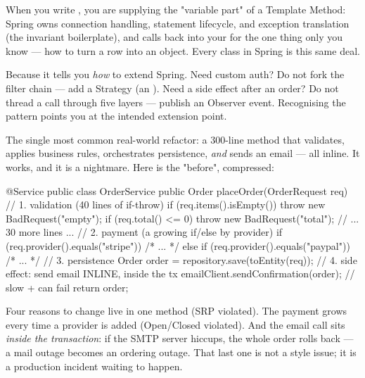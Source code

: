 \begin{behind}
When you write , you are supplying the "variable part" of a Template Method: Spring owns connection handling, statement lifecycle, and exception translation (the invariant boilerplate), and calls back into your  for the one thing only you know --- how to turn a row into an object. Every  class in Spring is this same deal.
\end{behind}

 Because it tells you \emph{how} to extend Spring. Need custom auth? Do not fork the filter chain --- add a Strategy (an ). Need a side effect after an order? Do not thread a call through five layers --- publish an Observer event. Recognising the pattern points you at the intended extension point.


 The single most common real-world refactor: a 300-line method that validates, applies business rules, orchestrates persistence, \emph{and} sends an email --- all inline. It works, and it is a nightmare. Here is the "before", compressed:

\begin{javabox}
@Service
public class OrderService {
  public Order placeOrder(OrderRequest req) {
    // 1. validation (40 lines of if-throw)
    if (req.items().isEmpty()) throw new BadRequest("empty");
    if (req.total() <= 0)      throw new BadRequest("total");
    // ... 30 more lines ...
    // 2. payment (a growing if/else by provider)
    if (req.provider().equals("stripe")) { /* ... */ }
    else if (req.provider().equals("paypal")) { /* ... */ }
    // 3. persistence
    Order order = repository.save(toEntity(req));
    // 4. side effect: send email INLINE, inside the tx
    emailClient.sendConfirmation(order);   // slow + can fail
    return order;
  }
}
\end{javabox}

 Four reasons to change live in one method (SRP violated). The payment  grows every time a provider is added (Open/Closed violated). And the email call sits \emph{inside the transaction}: if the SMTP server hiccups, the whole order rolls back --- a mail outage becomes an ordering outage. That last one is not a style issue; it is a production incident waiting to happen.

